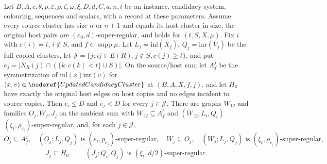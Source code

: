 \begin{lemma}
Let $B,A,c,\theta,p,\varepsilon,\rho,\zeta,\omega,\xi,D,d,C,a,n,t$
be an instance, candidacy system, colouring, sequences and scalars, with a
 record at these parameters.
Assume every source cluster has size $n$ or $n+1$ and equals its host
cluster in size, the original host pairs are
$(\varepsilon_0,d)$-super-regular, and
 holds for $(t,S,X,\mu)$.
Fix $i$ with $c(i)=t$, $i\notin S$, and $f\in\operatorname{supp}\mu$.
Let $L_j=\mathrm{inl}(X_j)$, $Q_j=\mathrm{inr}(V_j)$ be the full copied
clusters, let
$\mathcal J=\{j:ij\in E(R),j\notin S,c(j)\ge t\}$, and put
$e_j=|N_R(j)\cap(\{k:c(k)<t\}\cup S)|$.
On the source/host sum let $A_f^j$ be the symmetrization of
$\mathrm{inl}(x)\mathrm{inr}(v)$ for
$(x,v)\in\noderef{UpdatedCandidacyCluster}$ at $(B,A,X,f,j)$,
and let $H_0$ have exactly the original host edges on host copies and
no edges incident to source copies.
Then $e_i\le D$ and $e_j<D$ for every $j\in\mathcal J$.
There are graphs $W_{12}$ and families $O_j,W_j,J_j$ on the ambient sum
with $W_{12}\subseteq A_f^i$ and
$(W_{12};L_i,Q_i)$ $(\xi_t,\rho_{e_i})$-super-regular, and, for each
$j\in\mathcal J$,
\[
 O_j\subseteq A_f^j,\quad
 (O_j;L_j,Q_j)\text{ is }(\varepsilon_t,p_{e_j})\text{-super-regular},
 \quad W_j\subseteq O_j,\quad
 (W_j;L_j,Q_j)\text{ is }(\xi_t,\rho_{e_j})\text{-super-regular},
\]
\[
 J_j\subseteq H_0,\qquad
 (J_j;Q_i,Q_j)\text{ is }(\xi_t,d/2)\text{-super-regular}.
\]
\end{lemma}
